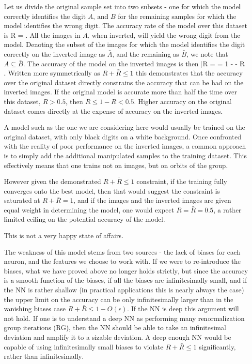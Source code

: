 \documentclass[twocolumn, nofootinbib, aps, prb]{revtex4-1}
\begin{document}
Let us divide the original sample set into two subsets - one for which the model correctly identifies the digit $A$, and $B$ for the remaining samples for which the model identifies the wrong digit. The accuracy rate of the model over this dataset is 
\be
R = 
\; .
\ee
All the images in $A$, when inverted, will yield the wrong digit from the model. Denoting the subset of the images for which the model identifies the digit correctly on the inverted image as ${\bar A}$, and the remaining as ${\bar B}$, we note that $A \subseteq {\bar B}$. The accuracy of the model on the inverted images is then
\be
{\bar R} =  = 1 -   - R
\; .
\ee
Written more symmetrically as $R + {\bar R} \leq 1$ this demonstrates that the accuracy over the original dataset directly constrains the accuracy that can be had on the inverted images. If the original model is accurate more than half the time over this dataset, $R>0.5$, then ${\bar R} \leq 1 - R < 0.5$. Higher accuracy on the original dataset comes directly at the expense of accuracy on the inverted images.

A model such as the one we are considering here would usually be trained on the original dataset, with only black digits on a white background. Once confronted with the reality of poor performance on the inverted images, a common approach is to simply add the additional manipulated samples to the training dataset. This effectively means that one trains not on images, but on orbits of the group.

However given the demonstrated $R + {\bar R} \leq 1$ constraint, if the training fully converges onto the best model, then that would suggest 
the constraint is saturated at $R + {\bar R} = 1$, and if the images and the inverted images are given equal weight in determining the model, one would expect $R = {\bar R} = 0.5$, a rather limited ceiling on the potential accuracy of the model.

This is not a very happy state of affairs. 

The weakness of this model stems from two sources - the lack of biases for each neuron, and the features we choose to work with. If we were to re-introduce the biases, what we have proved above no longer holds strictly, but since the accuracy is a smooth function of the biases, if all the biases are infinitesimally small, and if the NN is rather shallow (in practical applications this is nearly always the case) the upper limit on the accuracy can be only infinitesimally larger than in the vanishing biases case $R + {\bar R} \leq 1 + O(\epsilon)$. If the NN is deep this argument will not hold. If one is to understand a deep NN as performing many renormalization group iterations (RG)\cite{mehta2014exact}, then the NN should be able to take an infinitesimal deviation and amplify it to a sizable deviation. A deep enough NN would be capable of using infinitesimally small biases to violate $R + {\bar R} \leq 1$ significantly, rather than infinitesimally.
\end{document}

